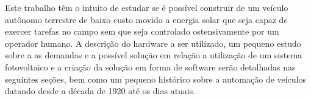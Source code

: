 Este trabalho têm o intuito de estudar se é possível construir de um veículo autônomo terrestre de baixo custo movido a energia solar que seja capaz de exercer tarefas no campo sem que seja controlado ostensivamente por um operador humano. A descrição do hardware a ser utilizado, um pequeno estudo sobre a as demandas e a possível solução em relação a utilização de um sistema fotovoltaico e a criação da solução em forma de software serão detalhadas nas seguintes seções, bem como um pequeno histórico sobre a automação de veículos datando desde a década de 1920 até os dias atuais.